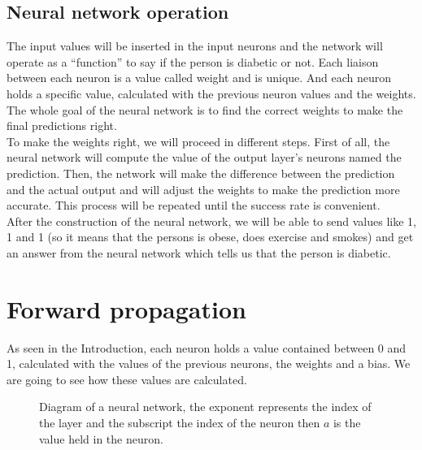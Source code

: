\documentclass[]{report}
\begin{document}
\subsection{Neural network operation}
\label{subsec:operation}

{The input values will be inserted in the input neurons and the network will operate as a “function” to say if the person is diabetic or not. Each liaison between each neuron is a value called weight and
is unique. And each neuron holds a specific value, calculated with the previous neuron values and the
weights. The whole goal of the neural network is to find the correct weights to make the final predictions
right.}\\

{To make the weights right, we will proceed in different steps. First of all, the neural network will
compute the value of the output layer’s neurons named the prediction. Then, the network will make
the difference between the prediction and the actual output and will adjust the weights to make the
prediction more accurate. This process will be repeated until the success rate is convenient.}\\

{After the construction of the neural network, we will be able to send values like 1, 1 and 1 (so it means that the persons is obese, does exercise and smokes) and get an answer from the neural network which tells us that the person is diabetic.}



\section{Forward propagation}

{As seen in the Introduction, each neuron holds a value contained between 0 and 1, calculated with the values of the previous neurons, the weights and a bias. We are going to see how these values are calculated.}

\begin{figure}[H]
    \centering
    \begin{neuralnetwork}[height=4, nodespacing=15mm]
        \newcommand{\inputtext}[2]{$a^{(l-1)}_#2$}
        \newcommand{\outputtext}[2]{$a^{(l)}_#2$}
        \inputlayer[count=3, bias=false, text=\inputtext, title=Input layer]
        \outputlayer[count=1,  text=\outputtext, title=Output layer]
        \linklayers[title=Weights $w_k$]
    \end{neuralnetwork}
    \caption{Diagram of a neural network, the exponent represents the index of the layer and the subscript the index of the neuron then $a$ is the value held in the neuron.}
\end{figure}
\end{document}
